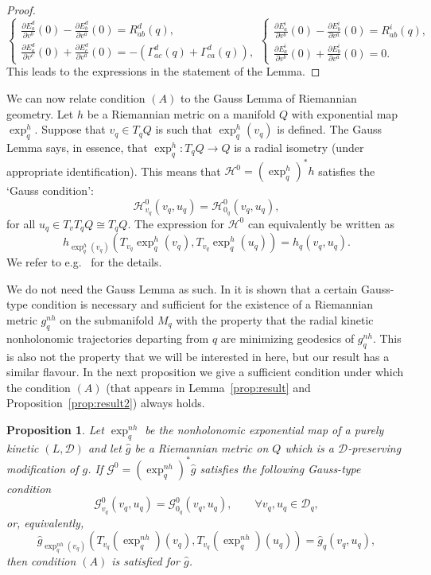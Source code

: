 \documentclass[11pt]{article}
\newtheorem{prop}{Proposition}
\def\D{{\mathcal D}}
\begin{document}
\begin{proof}
\begin{equation}
\begin{cases}
\displaystyle      \frac{\partial E_a^d}{\partial v^b}(0)-\frac{\partial E_b^d}{\partial v^a}(0)=R_{ab}^d(q),\\[2mm]
   \displaystyle   \frac{\partial E_a^d}{\partial v^c}(0)+\frac{\partial E_c^d}{\partial v^a}(0) =-(\Gamma_{ac}^d(q)+\Gamma_{ca}^d(q)),
    \end{cases}\nonumber  \begin{cases}
\displaystyle        \frac{\partial E_a^i}{\partial v^b}(0)-\frac{\partial E_b^i}{\partial v^a}(0) =R_{ab}^i(q), \\[2mm]
\displaystyle        \frac{\partial E_a^i}{\partial v^b}(0)+\frac{\partial E_b^i}{\partial v^a}(0)=0 .
    \end{cases}
\end{equation}
This leads to the expressions in the statement of the Lemma.
\end{proof}


We can now relate condition $(A)$ to the Gauss Lemma of Riemannian geometry.
Let $h$ be a Riemannian metric on a manifold $Q$ with exponential map $\exp^h_q$. Suppose that $v_q\in T_qQ$ is such that $\exp_q^h(v_q)$ is defined. 
The Gauss Lemma says, in essence, that  $\exp_q^h:T_qQ \to Q$ is  a radial isometry (under appropriate identification). This means that
${\mathcal H}^0=(\exp^{h}_q)^*h$ satisfies the `Gauss condition':
$$
\mathcal{H}^0_{v_q}(v_q,u_q)=\mathcal{H}^0_{0_q}(v_q,u_q),
$$ 
for all  $u_q\in T_{v}T_{q}Q\cong T_{q}Q$.
The expression for $\mathcal{H}^0$ can equivalently be written as
\[
h_{\exp^h_{q}(v_q)}(T_{v_q}\exp^h_{q}(v_q),T_{v_q}\exp^h_{q}(u_q))=h_q( v_q,u_q).
\]
 We refer to e.g.\ \cite{do} for the details. 

We do not need the Gauss Lemma as such. In \cite{Simoes} it is shown that a certain Gauss-type condition is necessary and sufficient for the existence of a Riemannian metric $g^{nh}_q$ on the submanifold $M_q$ with the property that the radial kinetic nonholonomic trajectories departing from $q$ are minimizing geodesics of $g^{nh}_q$. This is also not the property that we will be interested in here, but our result has a similar flavour. In the next proposition we give a sufficient condition under which the condition $(A)$ (that appears in Lemma~\ref{prop:result} and Proposition~\ref{prop:result2}) always holds. 

\begin{prop} \label{prop:gauss} Let $\exp^{nh}_q$ be the nonholonomic exponential map of a purely kinetic $(L,\D)$ and let $\hat{g}$ be a Riemannian metric on $Q$ which is a $\D$-preserving modification of $g$. If $\mathcal{G}^0=(\exp^{nh}_q)^* \hat{g}$ satisfies  the following Gauss-type condition 
$$
\mathcal{G}^0_{v_q}(v_q,u_q)=\mathcal{G}^0_{0_q}(v_q,u_q),\quad\quad\forall v_q,u_q\in\mathcal{D}_q,
$$
or, equivalently, 
$$
\hat{g}_{\exp^{nh}_q(v_q)}\left(T_{v_q}\left(\exp _q^{nh}\right)\left(v_{q}\right), T_{v_q}\left(\exp _q^{nh}\right)\left(u_{q}\right)\right)=\hat{g}_q(v_{q},u_{q}),
$$
 then condition $(A)$  is satisfied for $\hat{g}$. 
\end{prop}
\end{document}

